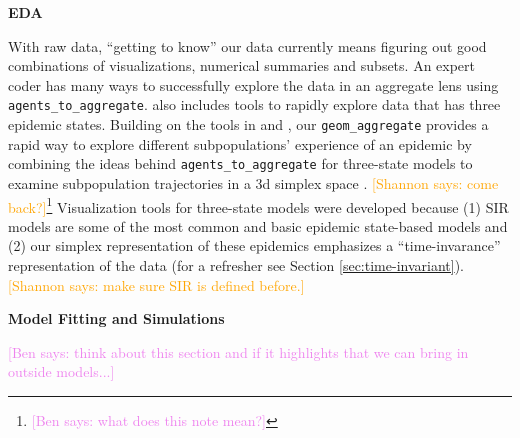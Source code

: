 \documentclass[
  shortnames]{jss}
\begin{document}
\textbf{EDA}

With raw data, ``getting to know'' our data currently means figuring out
good combinations of visualizations, numerical summaries and subsets. An
expert coder has many ways to successfully explore the data in an
aggregate lens using \texttt{agents\_to\_aggregate}. 
also includes tools to rapidly explore data that has three epidemic
states. Building on the tools in  and , our
\texttt{geom\_aggregate} provides a rapid way to explore different
subpopulations' experience of an epidemic by combining the ideas behind
\texttt{agents\_to\_aggregate} for three-state models to examine
subpopulation trajectories in a 3d simplex space
\citep{Wickham2016, Hamilton2018}.
\textcolor{orange}{[Shannon says: come back?]}\footnote{\textcolor{violet}{[Ben says: what does this note mean?]}}
Visualization tools for three-state models were developed because (1)
SIR models are some of the most common and basic epidemic state-based
models and (2) our simplex representation of these epidemics emphasizes
a ``time-invarance'' representation of the data (for a refresher see
Section \ref{sec:time-invariant}).
\textcolor{orange}{[Shannon says: make sure SIR is defined before.]}

\textbf{Model Fitting and Simulations}

\textcolor{violet}{[Ben says: think about this section and if it highlights that we can bring in outside models...]}
\end{document}
